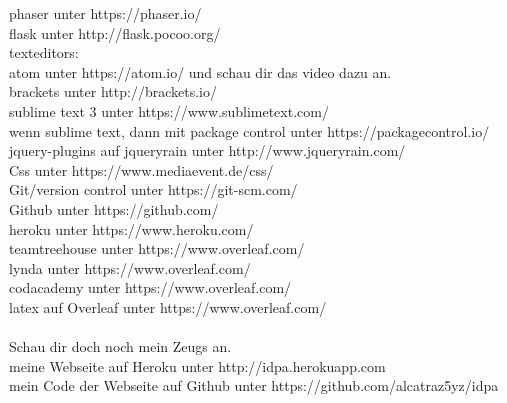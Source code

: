 \documentclass{article}
\begin{document}
phaser unter https://phaser.io/\\
flask unter http://flask.pocoo.org/\\
texteditors:\\
 atom unter https://atom.io/ und schau dir das video dazu an.\\
 brackets unter http://brackets.io/\\
 sublime text 3 unter https://www.sublimetext.com/\\
wenn sublime text, dann mit package control unter https://packagecontrol.io/\\
jquery-plugins auf jqueryrain unter http://www.jqueryrain.com/\\
Css unter https://www.mediaevent.de/css/\\
Git/version control unter https://git-scm.com/\\
Github unter https://github.com/\\
heroku unter https://www.heroku.com/\\
teamtreehouse unter https://www.overleaf.com/\\
lynda unter https://www.overleaf.com/\\
codacademy unter https://www.overleaf.com/\\
latex auf Overleaf unter https://www.overleaf.com/\\
\\
Schau dir doch noch mein Zeugs an.\\
meine Webseite auf Heroku unter http://idpa.herokuapp.com\\
mein Code der Webseite auf Github unter https://github.com/alcatraz5yz/idpa\\
\end{document}
